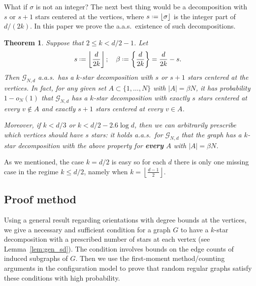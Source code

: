 \documentclass[12pt]{amsart}
\newtheorem{theorem}{Theorem}[section]
\theoremstyle{definition}
\newcommand\Gc{\mathcal{G}}
\newcommand\be{\beta}
\newcommand{\defeq}{\mathrel{\vcenter{\baselineskip0.5ex \lineskiplimit0pt
                     \hbox{\scriptsize.}\hbox{\scriptsize.}}}%
                     =}
\begin{document}
What if $\sigma$ is not an integer? The next best thing would be a decomposition with $s$ or $s+1$ stars centered at the vertices, where $s \defeq \lfloor \sigma \rfloor$ is the integer part of $d/(2k)$. In this paper we prove the a.a.s.~existence of such decompositions. 
%
\begin{theorem} \label{thm:main}
Suppose that $2 \leq k < d/2-1$. Let 
%
\begin{equation} \label{eq:s&al}
s \defeq \left\lfloor \frac{d}{2k} \right\rfloor ; \quad 
\be \defeq \left\{ \frac{d}{2k} \right\} = \frac{d}{2k} - s .
\end{equation}
%
Then $\Gc_{N,d}$ a.a.s.~has a $k$-star decomposition with $s$ or $s+1$ stars centered at the vertices. In fact, for any given set $A \subset \{1,\ldots,N\}$ with $|A|=\be N$, it has probability $1-o_N(1)$ that $\Gc_{N,d}$ has a $k$-star decomposition with exactly $s$ stars centered at every $v \notin A$ and exactly $s+1$ stars centered at every $v \in A$.

Moreover, if $k<d/3$ or $k<d/2-2.6 \log d$, then we can arbitrarily prescribe which vertices should have $s$ stars: it holds a.a.s.~for $\Gc_{N,d}$ that the graph has a $k$-star decomposition with the above property for \textbf{every} $A$ with $|A|=\be N$. 
\end{theorem}
%

As we mentioned, the case $k=d/2$ is easy so for each $d$ there is only one missing case in the regime $k \leq d/2$, namely when $k=\left\lfloor\frac{d-1}{2}\right\rfloor$. 


\subsection*{Proof method}
Using a general result regarding orientations with degree bounds at the vertices, we give a necessary and sufficient condition for a graph $G$ to have a $k$-star decomposition with a prescribed number of stars at each vertex (see Lemma~\ref{lem:gen_sd}). The condition involves bounds on the edge counts of induced subgraphs of $G$. Then we use the first-moment method/counting arguments in the configuration model to prove that random regular graphs satisfy these conditions with high probability.
\end{document}
